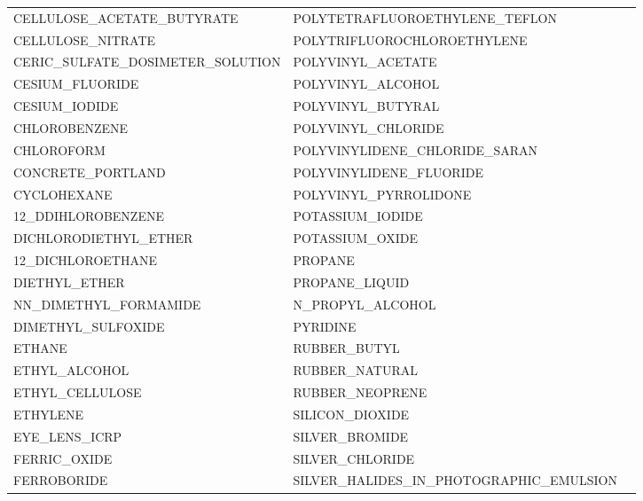 \begin{center}
\begin{longtable}{lll}
CELLULOSE_ACETATE_BUTYRATE          & POLYTETRAFLUOROETHYLENE_TEFLON            \\
CELLULOSE_NITRATE                   & POLYTRIFLUOROCHLOROETHYLENE               \\
CERIC_SULFATE_DOSIMETER_SOLUTION    & POLYVINYL_ACETATE                         \\
CESIUM_FLUORIDE                     & POLYVINYL_ALCOHOL                         \\
CESIUM_IODIDE                       & POLYVINYL_BUTYRAL                         \\
CHLOROBENZENE                       & POLYVINYL_CHLORIDE                        \\
CHLOROFORM                          & POLYVINYLIDENE_CHLORIDE_SARAN             \\
CONCRETE_PORTLAND                   & POLYVINYLIDENE_FLUORIDE                   \\
CYCLOHEXANE                         & POLYVINYL_PYRROLIDONE                     \\
12_DDIHLOROBENZENE                  & POTASSIUM_IODIDE                          \\
DICHLORODIETHYL_ETHER               & POTASSIUM_OXIDE                           \\
12_DICHLOROETHANE                   & PROPANE                                   \\
DIETHYL_ETHER                       & PROPANE_LIQUID                            \\
NN_DIMETHYL_FORMAMIDE               & N_PROPYL_ALCOHOL                          \\
DIMETHYL_SULFOXIDE                  & PYRIDINE                                  \\
ETHANE                              & RUBBER_BUTYL                              \\
ETHYL_ALCOHOL                       & RUBBER_NATURAL                            \\
ETHYL_CELLULOSE                     & RUBBER_NEOPRENE                           \\
ETHYLENE                            & SILICON_DIOXIDE                           \\
EYE_LENS_ICRP                       & SILVER_BROMIDE                            \\
FERRIC_OXIDE                        & SILVER_CHLORIDE                           \\
FERROBORIDE                         & SILVER_HALIDES_IN_PHOTOGRAPHIC_EMULSION   \\

\end{longtable}
\end{center}
